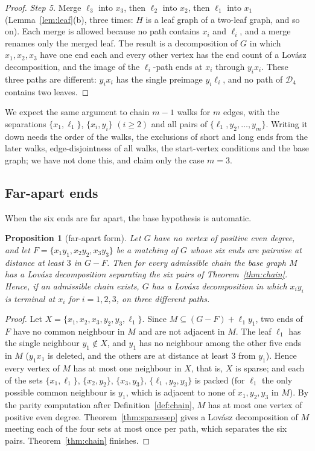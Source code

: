\documentclass[11pt]{amsart}
\newtheorem{proposition}[theorem]{Proposition}
\theoremstyle{definition}
\newcommand{\cD}{\mathcal D}
\newcommand{\lean}[1]{\quad{\footnotesize[Lean: \texttt{#1}]}}
\begin{document}
\begin{proof}
\emph{Step 5.} Merge $\ell_3$ into $x_3$, then $\ell_2$ into $x_2$, then $\ell_1$ into $x_1$
(Lemma~\ref{lem:leaf}(b), three times: $H$ is a leaf graph of a two-leaf graph, and so on). Each
merge is allowed because no path contains $x_i$ and $\ell_i$, and a merge renames only the
merged leaf. The result is a decomposition of $G$ in which $x_1,x_2,x_3$ have one end each and
every other vertex has the end count of a Lov\'asz decomposition, and the image of the
$\ell_i$-path ends at $x_i$ through $y_ix_i$. These three paths are different: $y_ix_i$ has the
single preimage $y_i\ell_i$, and no path of $\cD_4$ contains two leaves.
\end{proof}

We expect the same argument to chain $m-1$ walks for $m$ edges, with the separations
$\{x_1,\ell_1\}$, $\{x_i,y_i\}$ $(i\ge2)$ and all pairs of $\{\ell_1,y_2,\dots,y_m\}$. Writing it
down needs the order of the walks, the exclusions of short and long ends from the later walks,
edge-disjointness of all walks, the start-vertex conditions and the base graph; we have not done
this, and claim only the case $m=3$.

\subsection*{Far-apart ends}
When the six ends are far apart, the base hypothesis is automatic.

\begin{proposition}[far-apart form]\label{prop:far}
Let $G$ have no vertex of positive even degree, and let $F=\{x_1y_1,x_2y_2,x_3y_3\}$ be a matching
of $G$ whose six ends are pairwise at distance at least $3$ in $G-F$. Then for every admissible
chain the base graph $M$ has a Lov\'asz decomposition separating the six pairs of
Theorem~\ref{thm:chain}. Hence, if an admissible chain exists, $G$ has a Lov\'asz decomposition
in which $x_iy_i$ is terminal at $x_i$ for $i=1,2,3$, on three different paths.\lean{base3\_of\_far, ptm3\_of\_far}
\end{proposition}

\begin{proof}
Let $X=\{x_1,x_2,x_3,y_2,y_3,\ell_1\}$. Since $M\subseteq(G-F)+\ell_1y_1$, two ends of $F$ have no common neighbour in $M$ and are not adjacent in
$M$. The leaf $\ell_1$ has the single neighbour $y_1\notin X$, and $y_1$ has no neighbour among the
other five ends in $M$ ($y_1x_1$ is deleted, and the others are at distance at least $3$ from
$y_1$). Hence every vertex of $M$ has at most one neighbour in $X$, that is, $X$ is sparse; and
each of the sets $\{x_1,\ell_1\}$, $\{x_2,y_2\}$, $\{x_3,y_3\}$, $\{\ell_1,y_2,y_3\}$ is packed (for
$\ell_1$ the only possible common neighbour is $y_1$, which is adjacent to none of $x_1,y_2,y_3$
in $M$). By the parity computation after Definition~\ref{def:chain}, $M$ has at most one vertex
of positive even degree. Theorem~\ref{thm:sparsesep} gives a Lov\'asz decomposition of $M$ meeting
each of the four sets at most once per path, which separates the six pairs. Theorem~\ref{thm:chain}
finishes.
\end{proof}
\end{document}
